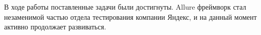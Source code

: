 \startconclusionpage

В ходе работы поставленные задачи были достигнуты. Allure фреймворк стал незаменимой частью отдела тестирования компании Яндекс, и на данный момент активно продолжает развиваться.

